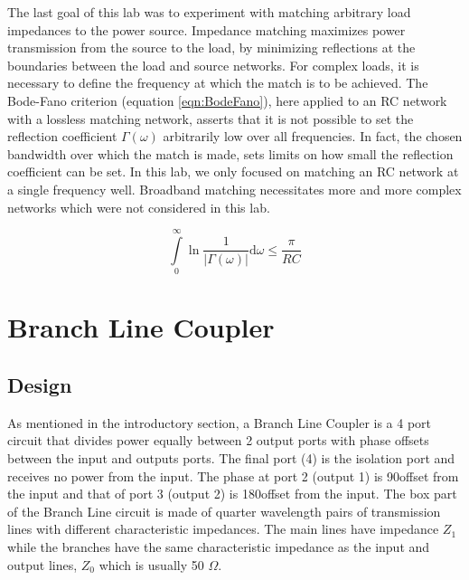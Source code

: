 \documentclass[twocolumn, aps, apl]{revtex4-1}
\begin{document}
The last goal of this lab was to experiment with matching arbitrary load impedances to the power source. Impedance matching maximizes power transmission from the source to the load, by minimizing reflections at the boundaries between the load and source networks. For complex loads, it is necessary to define the frequency at which the match is to be achieved. The Bode-Fano criterion (equation \ref{eqn:BodeFano}), here applied to an RC network with a lossless matching network, asserts that it is not possible to set the reflection coefficient $\Gamma (\omega)$ arbitrarily low over all frequencies. In fact, the chosen bandwidth over which the match is made, sets limits on how small the reflection coefficient can be set. In this lab, we only focused on matching an RC network at a single frequency well. Broadband matching necessitates more and more complex networks which were not considered in this lab.

\begin{equation}
    \int \limits_0^\infty \ln \frac{1}{\lvert \Gamma(\omega) \rvert} \mathrm d \omega \leq \frac{\pi}{R C}
    \label{eqn:BodeFano}
\end{equation}

\section*{Branch Line Coupler}\label{sec:BranchLine}

\subsection{Design}
As mentioned in the introductory section, a Branch Line Coupler is a 4 port circuit that divides power equally between 2 output ports with phase offsets between the input and outputs ports. The final port (4) is the isolation port and receives no power from the input. The phase at port 2 (output 1) is 90\textdegree offset from the input and that of port 3 (output 2) is 180\textdegree offset from the input. The box part of the Branch Line circuit is made of quarter wavelength pairs of transmission lines with different characteristic impedances. The main lines have impedance $Z_1$ while the branches have the same characteristic impedance as the input and output lines, $Z_0$ which is usually 50 $\Omega$.
\end{document}
